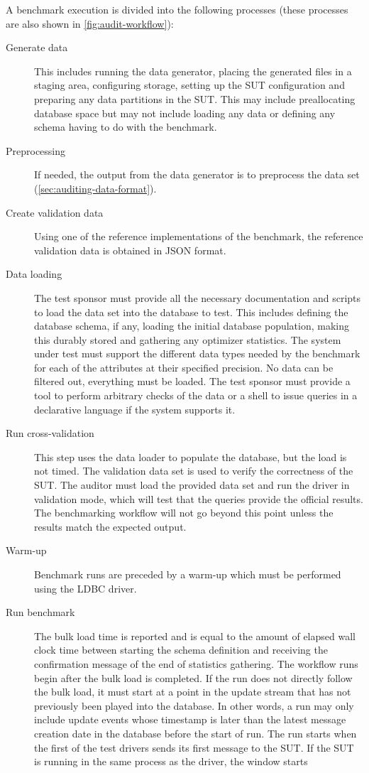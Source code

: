 A benchmark execution is divided into the following processes (these processes are also shown in \autoref{fig:audit-workflow}):

\begin{description}
    \item[Generate data] This includes running the data generator, placing the generated files in a staging area, configuring storage, setting up the SUT configuration and preparing any data partitions in the SUT. This may include preallocating database space but may not include loading any data or defining any schema having to do with the benchmark.
    \item[Preprocessing] If needed, the output from the data generator is to preprocess the data set (\autoref{sec:auditing-data-format}).
    \item[Create validation data] Using one of the reference implementations of the benchmark, the reference validation data is obtained in JSON format.
    \item[Data loading] The test sponsor must provide all the necessary documentation and scripts to load the data set into the database to test.
        This includes defining the database schema, if any, loading the initial database population, making this durably stored and gathering any optimizer statistics.
        The system under test must support the different data types needed by the benchmark for each of the attributes at their specified precision. No data can be filtered out, everything must be loaded. The test sponsor must provide a tool to perform arbitrary checks of the data or a shell to issue queries in a declarative language if the system supports it.
    \item[Run cross-validation] This step uses the data loader to populate the database, but the load is not timed. The validation data set is used to verify the correctness of the SUT. The auditor must load the provided data set and run the driver in validation mode, which will test that the queries provide the official results.  The benchmarking workflow will not go beyond this point unless the results match the expected output.
    \item[Warm-up] Benchmark runs are preceded by a warm-up which must be performed using the LDBC driver.
    \item[Run benchmark] The bulk load time is reported and is equal to the amount of elapsed wall clock time between starting the schema definition and receiving the confirmation message of the end of statistics gathering. The workflow runs begin after the bulk load is completed. If the run does not directly follow the bulk load, it must start at a point in the update stream that has not previously been played into the database. In other words, a run may only include update events whose timestamp is later than the latest message creation date in the database before the start of run. The run starts when the first of the test drivers sends its first message to the SUT. If the SUT is running in the same process as the driver, the window starts

\end{description}

